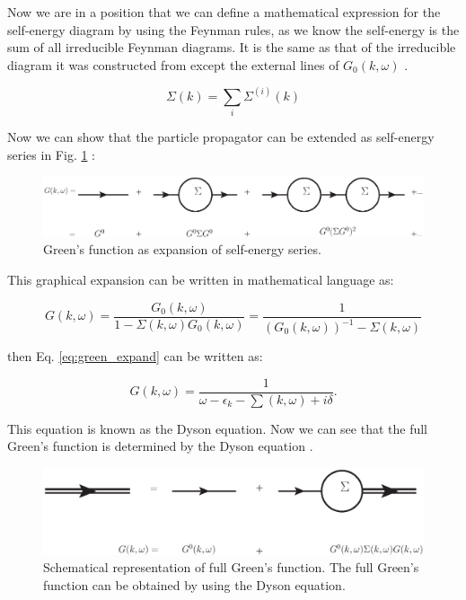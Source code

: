 Now we are in a position that we can define a mathematical expression for the self-energy diagram by using the Feynman rules, as we know the self-energy is the sum of all irreducible Feynman diagrams. It is the same as that of the irreducible diagram it was constructed from except the external lines of $G_0(k, \omega)$ \cite{Dimitri}. 

\begin{equation}
    \Sigma (k)= \sum_i \Sigma^{(i)}(k)
\end{equation}

Now we can show that the particle propagator can be extended as self-energy series in Fig. \ref{fig:GREEN_expand} \cite{Piers,MICHAEL}:

\begin{figure}[ht]
\centering
    \includegraphics[width=0.9\linewidth]{fig2/GREEN.eps}
    \caption{Green's function as expansion of self-energy series.}
\label{fig:GREEN_expand}
\end{figure}

\noindent This graphical expansion can be written in mathematical language as:

\begin{equation} \label{eq:green_expand}
    G(k,\omega) = \frac{G_0(k,\omega)}{1-\Sigma(k,\omega) G_0(k,\omega)}= \frac{1}{(G_0(k, \omega))^{-1}-\Sigma (k,\omega)}
\end{equation}

\noindent then Eq. \ref{eq:green_expand} can be written as:

\begin{equation}
    G(k, \omega)= \frac{1}{\omega - \epsilon_k - \sum (k, \omega)+i\delta}.
\end{equation}

\noindent This equation is known as the Dyson equation. Now we can see that the full Green's function is determined by the Dyson equation \cite{Piers, MICHAEL}.

\begin{figure}[ht]
\centering
    \includegraphics[width=0.9\linewidth]{fig2/dyson.eps}
     \caption{Schematical representation of full Green's function. The full Green's function can be obtained by using the Dyson equation.}
\label{fig:dyson}
\end{figure}

